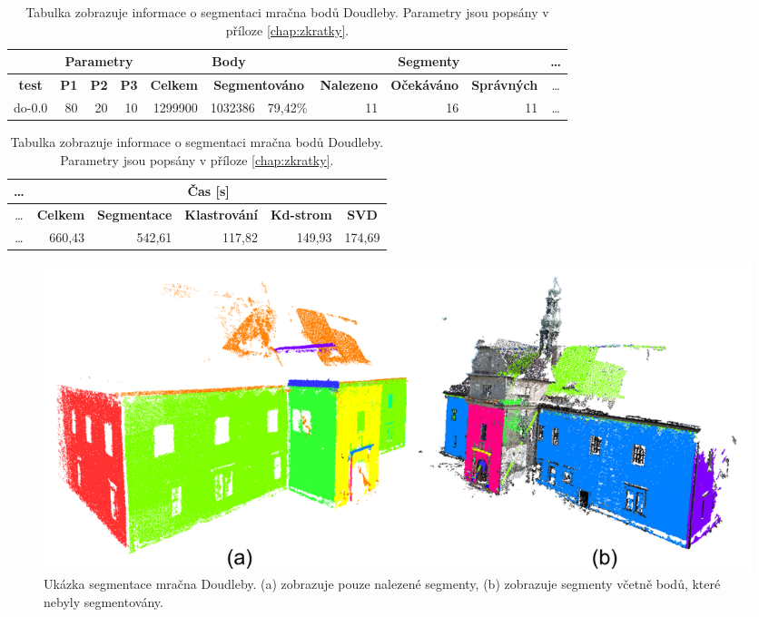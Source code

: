 \documentclass[11pt,twoside,a4paper]{book}
\begin{document}
\begin{table}[ht]
\resizebox{\textwidth}{!} {
\begin{tabular}{|r|r|r|r|r|r|r|r|r|r|c|}
\hline
\textbf{} & \multicolumn{ 3}{c|}{\textbf{Parametry}} & \multicolumn{ 3}{c|}{\textbf{Body}} & \multicolumn{ 3}{c|}{\textbf{Segmenty}} &\ldots\\ \hline
\multicolumn{1}{|c|}{\textbf{test}} & \textbf{P1} & \multicolumn{1}{c|}{\textbf{P2}} & \multicolumn{1}{c|}{\textbf{P3}} & \textbf{Celkem} & \multicolumn{ 2}{c|}{\textbf{Segmentováno}} & \textbf{Nalezeno} & \multicolumn{1}{c|}{\textbf{Očekáváno }} & \multicolumn{1}{c|}{\textbf{Správných}} &\ldots\\ \hline
do-0.0 & \multicolumn{1}{r|}{80} & \multicolumn{1}{r|}{20} & \multicolumn{1}{r|}{10} & \multicolumn{1}{r|}{1299900} & \multicolumn{1}{r|}{1032386} & \multicolumn{1}{r|}{79,42\%} & \multicolumn{1}{r|}{11} & \multicolumn{1}{r|}{16} & \multicolumn{1}{r|}{11} &\ldots\\ \hline
\end{tabular}
}
\begin{flushright} \scalebox{0.9} {
\begin{tabular}{|c|r|r|r|r|r|}
\hline
\ldots& \multicolumn{ 5}{|c|}{\textbf{Čas [s]}} \\ \hline
\ldots& \textbf{Celkem} & \multicolumn{1}{c|}{\textbf{Segmentace}} & \multicolumn{1}{c|}{\textbf{Klastrování}} & \multicolumn{1}{c|}{\textbf{Kd-strom}} & \multicolumn{1}{c|}{\textbf{SVD}} \\ \hline
\ldots& \multicolumn{1}{|r|}{660,43} & \multicolumn{1}{r|}{542,61} & \multicolumn{1}{r|}{117,82} & \multicolumn{1}{r|}{149,93} & \multicolumn{1}{r|}{174,69} \\ \hline
\end{tabular}
}\end{flushright}

\caption{Tabulka zobrazuje informace o segmentaci mračna bodů Doudleby. Parametry jsou popsány v příloze \ref{chap:zkratky}.} 
\label{table:test-do}
\end{table}

\begin{figure}[ht]
\begin{center}
\includegraphics[width=\textwidth]{figures/test-do}
\caption{Ukázka segmentace mračna Doudleby. (a) zobrazuje pouze nalezené segmenty, (b) zobrazuje segmenty včetně bodů, které nebyly segmentovány.}
\label{fig:test-do}
\end{center}
\end{figure}
\end{document}
